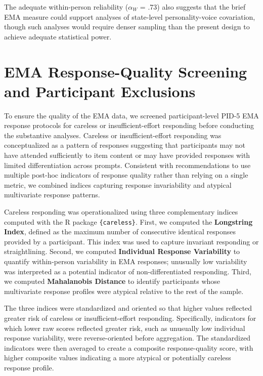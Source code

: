 \documentclass[
  english,
  man,floatsintext]{apa6}
\begin{document}
The adequate within-person reliability (\(\alpha_W\) = .73) also suggests that the brief EMA measure could support analyses of state-level personality-voice covariation, though such analyses would require denser sampling than the present design to achieve adequate statistical power.

\newpage

\section{EMA Response-Quality Screening and Participant Exclusions}\label{ema-response-quality-screening-and-participant-exclusions}

To ensure the quality of the EMA data, we screened participant-level PID-5 EMA response protocols for careless or insufficient-effort responding before conducting the substantive analyses. Careless or insufficient-effort responding was conceptualized as a pattern of responses suggesting that participants may not have attended sufficiently to item content or may have provided responses with limited differentiation across prompts. Consistent with recommendations to use multiple post-hoc indicators of response quality rather than relying on a single metric, we combined indices capturing response invariability and atypical multivariate response patterns.

Careless responding was operationalized using three complementary indices computed with the R package \texttt{\{careless\}}. First, we computed the \textbf{Longstring Index}, defined as the maximum number of consecutive identical responses provided by a participant. This index was used to capture invariant responding or straightlining. Second, we computed \textbf{Individual Response Variability} to quantify within-person variability in EMA responses; unusually low variability was interpreted as a potential indicator of non-differentiated responding. Third, we computed \textbf{Mahalanobis Distance} to identify participants whose multivariate response profiles were atypical relative to the rest of the sample.

The three indices were standardized and oriented so that higher values reflected greater risk of careless or insufficient-effort responding. Specifically, indicators for which lower raw scores reflected greater risk, such as unusually low individual response variability, were reverse-oriented before aggregation. The standardized indicators were then averaged to create a composite response-quality score, with higher composite values indicating a more atypical or potentially careless response profile.
\end{document}
